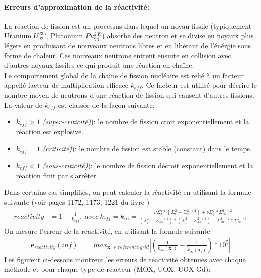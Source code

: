 \paragraph{Erreurs d'approximation de la réactivité:}
La réaction de fission est un processus dans lequel un noyau fissile (typiquement Uranium $U_{92}^{235}$, Plutonium $Pu_{94}^239$) absorbe
des neutron et se divise en noyaux plus légers en produisant de nouveaux neutrons libres et en libérant de l'énérgie sous forme de chaleur.
Ces nouveaux neutrons entrent ensuite en collision avec d'autres noyaux fissiles ce qui produit une réaction en chaîne.\\
\hspace{0.5cm}
Le comportement global de la chaîne de fission nucléaire est relié à un facteur appellé facteur de multiplication efficace $k_{eff}$.
Ce facteur est utilisé pour décrire le nombre moyen de neutrons d'une réaction de fission qui causent d'autres fissions.\\
La valeur de $k_{eff}$ est classée de la façon suivante:
\begin{itemize}
\item $k_{eff} > 1$ \textit{(super-criticité)}): le nombre de fission croit exponentiellement et la
réaction est explosive.
\item $k_{eff} = 1$ \textit{(criticité)}): le nombre de fission est stable (constant) dans le temps.
\item $k_{eff} < 1$ \textit{(sous-criticité)}): le nombre de fission décroit exponentiellement et la
réaction finit par s'arrêter.
\end{itemize}
Dans certains cas simplifiés, on peut calculer la réactivité en utilisant la formule suivante (voir pages 1172, 1173, 1221 du livre \cite{Marguet})
\begin{align}
		reactivity & = 1-\frac{1}{k_{eff}},\ avec\ k_{eff} = k_{\infty}=\frac{\nu\Sigma_f^1 * (\Sigma_t^2-\Sigma_{s0}^{2\rightarrow2}) + \nu\Sigma_f^2*\Sigma_{s0}^{1\rightarrow2}}{(\Sigma_t^1-\Sigma_{s0}^{1\rightarrow1})*(\Sigma_t^2-\Sigma_{s0}^{2\rightarrow2})-\Sigma_{s0}^{1\rightarrow2}*\Sigma_{s0}^{2\rightarrow1}}
\end{align}
On mesure l'erreur de la réactivité, en utilisant la formule suivante:
\begin{align}
		\textbf{e}_{reactivity}{(inf)} & = max_{\textbf{x}_i \in reference\ grid} \left | (\frac{1}{k_{\infty}(\textbf{x}_i)} - \frac{1}{\tilde{k}_{\infty}(\textbf{x}_i)})*10^5 \right |
\end{align}
Les figurent ci-dessous montrent les erreurs de réactivité obtenues avec chaque méthode et pour chaque type de réacteur (MOX, UOX, UOX-Gd):
